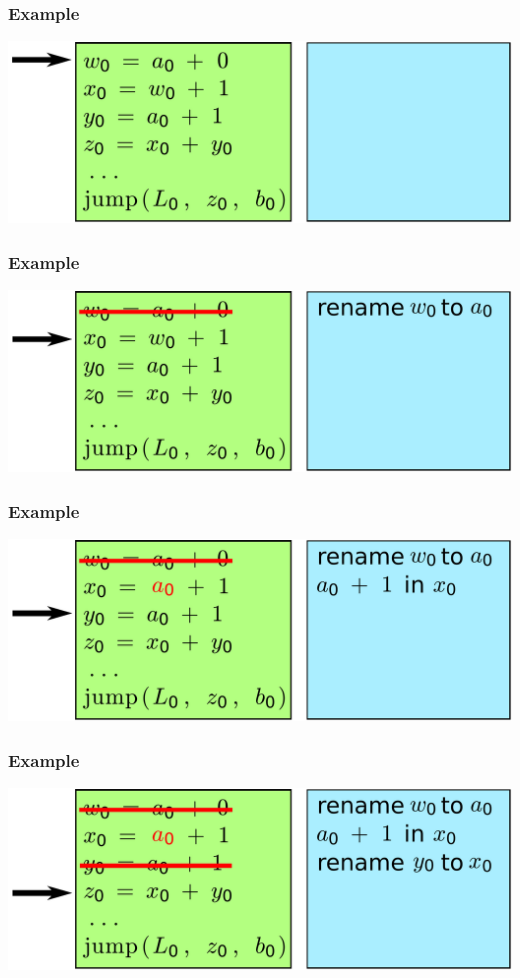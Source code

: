 \documentclass[utf8x]{beamer}
\begin{document}
\begin{frame}
  \frametitle{Example}
  \includegraphics[width=\columnwidth]{figures/optimization1}
\end{frame}

\begin{frame}
  \frametitle{Example}
  \includegraphics[width=\columnwidth]{figures/optimization2}
\end{frame}

\begin{frame}
  \frametitle{Example}
  \includegraphics[width=\columnwidth]{figures/optimization3}
\end{frame}

\begin{frame}
  \frametitle{Example}
  \includegraphics[width=\columnwidth]{figures/optimization4}
\end{frame}
\end{document}
